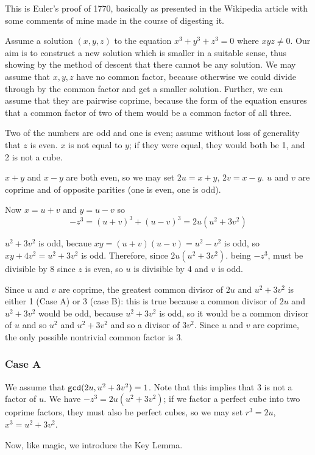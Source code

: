 \documentclass[12pt]{article}
\begin{document}
This is Euler's proof of 1770, basically  as presented in the Wikipedia article with some comments of mine made in the course of digesting it.

Assume a solution $(x,y,z)$  to the equation $x^3+y^3+z^3=0$ where $xyz \neq 0$.  Our aim is to construct a new solution which is smaller in a suitable sense, thus showing by the method of descent that there cannot be any solution. We may assume that $x,y,z$ have no common factor, because otherwise we could divide through by the common factor and get a smaller solution.   Further, we can assume that they are pairwise coprime, because the form of the equation ensures that a common factor of two of them would be a common factor of all three.  

Two of the numbers are odd and one is even;  assume without loss of generality that $z$ is even.  $x$ is not equal to $y$; if they were equal, they would both be 1, and 2 is not a cube.

$x+y$ and $x-y$ are both even, so we may set $2u=x+y$, $2v=x-y$.   $u$ and $v$ are coprime and of opposite parities (one is even, one is odd).

Now $x=u+v$ and $y=u-v$ so
$$-z^3=(u+v)^3+(u-v)^3=2u(u^2+3v^2)$$

$u^2+3v^2$ is odd, becaue $xy=(u+v)(u-v) = u^2-v^2$ is odd, so $xy+4v^2 = u^2+3v^2$ is odd.  Therefore, since $2u(u^2+3v^2)$. being $-z^3$, must be divisible by 8 since $z$ is even, so $u$ is divisible by 4 and $v$ is odd.

Since $u$ and $v$ are coprime, the greatest common divisor of $2u$ and $u^2+3v^2$ is either 1 (Case A) or 3 (case B):  this is true because a common divisor of $2u$ and $ u^2+3v^2$ would be odd, because $u^2+3v^2$ is odd, so it would be a common divisor of $u$ and so $u^2$ and $u^2+3v^2$ and so a divisor of $3v^2$.  Since $u$ and $v$ are coprime, the only possible nontrivial common factor is 3.

\subsubsection{Case A}

We assume that ${\tt gcd}(2u,u^2+3v^2)=1$.  Note that this implies that 3 is not a factor of $u$.  We have $-z^3=2u(u^2+3v^2)$;
if we factor a perfect cube into two coprime factors, they must also be perfect cubes, so we may set $r^3=2u$, $x^3=u^2+3v^2$.

Now, like magic, we introduce the Key Lemma.
\end{document}
